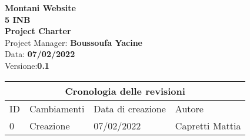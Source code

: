 \documentclass{article}
\begin{document}
	
	
	\begin{titlepage}
		\begin{center}
			\huge\textbf{Montani Website}\\
			\Large\textbf{5 INB}\\
			\Large \textbf{Project Charter}\\
			\vspace{4cm}
			\large Project Manager: \textbf{Boussoufa Yacine}\\
			\large Data: \textbf{07/02/2022}\\
			\large Versione:\textbf{0.1}\\
		\end{center}
	\end{titlepage}
	
	\clearpage
	
	\begin{tabular}{ |p{1cm}|p{4cm}|p{3cm}|p{2cm}|  }
		\hline
		\multicolumn{4}{|c|}{Cronologia delle revisioni} \\
		\hline
		ID& Cambiamenti &Data di creazione&Autore\\
		\hline
		0   & Creazione    &07/02/2022&   Capretti Mattia\\
		\hline
	\end{tabular}
	
	\clearpage
	
	\tableofcontents
	
	
	
	\printindex
	
	
\end{document}
